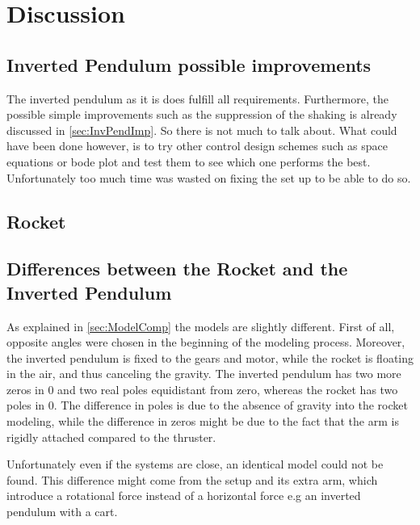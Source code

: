 \chapter{Discussion}\label{sec:Discussion}

\section{Inverted Pendulum possible improvements}

The inverted pendulum as it is does fulfill all requirements. Furthermore, the possible simple improvements such as the suppression of the shaking is already discussed in \autoref{sec:InvPendImp}. So there is not much to talk about. What could have been done however, is to try other control design schemes such as space equations or bode plot and test them to see which one performs the best. Unfortunately too much time was wasted on fixing the set up to be able to do so.

\section{Rocket}



\section{Differences between the Rocket and the Inverted Pendulum}

As explained in \autoref{sec:ModelComp} the models are slightly different. First of all, opposite angles were chosen in the beginning of the modeling process. Moreover, the inverted pendulum is fixed to the gears and motor, while the rocket is floating in the air, and thus canceling the gravity. The inverted pendulum has two more zeros in 0 and two real poles equidistant from zero, whereas the rocket has two poles in 0. The difference in poles is due to the absence of gravity into the rocket modeling, while the difference in zeros might be due to the fact that the arm is rigidly attached compared to the thruster.

Unfortunately even if the systems are close, an identical model could not be found. This difference might come from the setup and its extra arm, which introduce a rotational force instead of a horizontal force e.g an inverted pendulum with a cart.